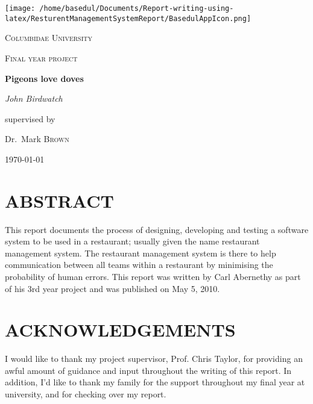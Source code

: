 \documentclass[12pt,a4paper]{article}
\begin{document}
	
	\begin{titlepage}
	\begin{center}
	\centering
	\texttt{[image: /home/basedul/Documents/Report-writing-using-latex/ResturentManagementSystemReport/BasedulAppIcon.png]}\par\vspace{1cm}
	{\scshape\LARGE Columbidae University \par}
	\vspace{1cm}
	{\scshape\Large Final year project\par}
	\vspace{1.5cm}
	{\huge\bfseries Pigeons love doves\par}
	\vspace{2cm}
	{\Large\itshape John Birdwatch\par}
	\vfill
	supervised by\par
	Dr.~Mark \textsc{Brown}

	\vfill

	{\large \today\par}
\end{center}
\end{titlepage}
	
	\section*{ABSTRACT}
	This report documents the process of designing, developing and testing a software system to be used in a
restaurant; usually given the name restaurant management system. The restaurant management system
is there to help communication between all teams within a restaurant by minimising the probability
of human errors. This report was written by Carl Abernethy as part of his 3rd year project and was
published on May 5, 2010.\\
	\section*{ACKNOWLEDGEMENTS}
	I would like to thank my project supervisor, Prof. Chris Taylor, for providing an awful amount of
guidance and input throughout the writing of this report. In addition, I’d like to thank my family for
the support throughout my final year at university, and for checking over my report.\\
\end{document}
